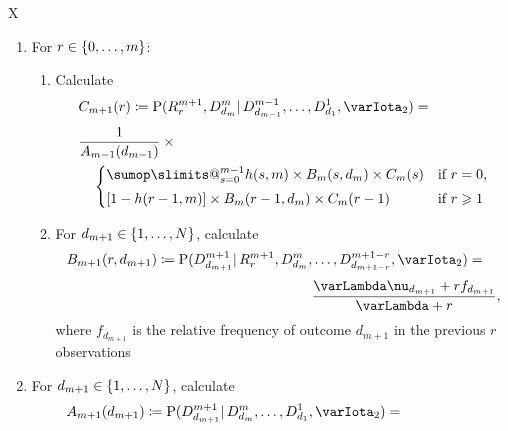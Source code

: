 \documentclass[\ifafour a4paper,12pt,\else a5paper,10pt,\fi%
onecolumn,oneside,article,%
british%
]{memoir}
\makeatletter
\theoremstyle{remark}
\theoremstyle{innote}
\def\sum{\DOTSI\sumop\slimits@}
\newcommand*{\defd}{\coloneqq}
\renewcommand{\le}{\leqslant}%
\renewcommand{\ge}{\geqslant}%
\DeclarePairedDelimiter\set{\{}{\}}
\newcommand*{\p}{\mathrm{P}}%
\renewcommand*{\|}{\mathpunct{|}}
\newcommand*{\yff}{f}
\newcommand*{\yI}{\varIota}
\newcommand*{\yMc}{\yI_2}
\newcommand*{\yN}{\varLambda}
\newcommand*{\ynn}{\nu}
\newcommand*{\yrs}{h}
\makeatother
\begin{document}
\begin{table}[!p]
  \centering
  \caption{Predictive algorithm}
  \label{tab:adamsetal_algorithm}
  \begin{tabularx}{\textwidth}{X}\hline
    \begin{enumerate}
    \item\label{item:first_step}For $r \in \set{0,\dotsc, m}$:
      \begin{enumerate}[label*=\arabic*.]
      \item Calculate
        \[ \begin{multlined}[t][0.85\textwidth]
            C_{m+1}(r) \defd
            \p(R^{m+1}_{r} , D^{m}_{d_{m}} \| D^{m-1}_{d_{m-1}}, \dotsc,
            D^{1}_{d_{1}}, \yMc) ={}\\[\jot]
       \shoveleft{\frac{1}{A_{m-1}(d_{m-1})} \times{}}\\\begin{cases}
          \sum_{s=0}^{m-1} \yrs(s,m) \times B_m(s,d_m) \times C_m(s) & \text{if $r=0$},
          \\[\jot]
          [1-\yrs(r-1,m)]  \times B_m(r-1,d_m) \times C_m(r-1)& \text{if $r\ge 1$}    
        \end{cases}
      \end{multlined}
    \]
      \item For $d_{m+1} \in \set{1,\dotsc,N}$, calculate
        \[ \begin{multlined}[][0.85\textwidth]
B_{m+1}(r,d_{m+1}) \defd \p(D^{m+1}_{d_{m+1}} \| R^{m+1}_{r}, D^{m}_{d_{m}},
          \dotsc, D^{m+1-r}_{d_{m+1-r}}, \yMc) ={}\\[\jot]
         \frac{\yN\ynn_{d_{m+1}}+r\yff_{d_{m+1}}}{\yN + r},
       \end{multlined} \]
     where $\yff_{d_{m+1}}$ is the relative frequency of outcome $d_{m+1}$ in the previous $r$ observations
  \end{enumerate}
\item For $d_{m+1} \in \set{1,\dotsc,N}$, calculate
  \[ \begin{multlined}[][0.85\textwidth]
      A_{m+1}(d_{m+1}) \defd \p(D^{m+1}_{d_{m+1}} \| D^{m}_{d_{m}}, \dotsc, D^{1}_{d_{1}}, \yMc) ={}\\[\jot]

\end{multlined}\]
\end{enumerate}
\end{tabularx}
\end{table}
\end{document}
